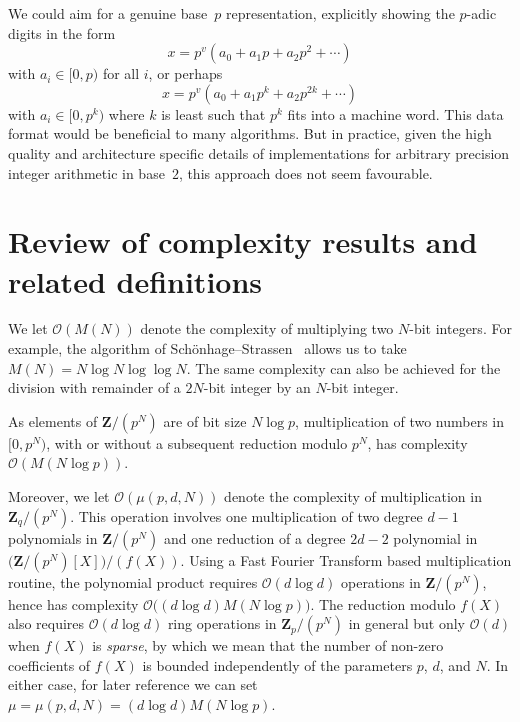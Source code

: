 \begin{rem}
We could aim for a genuine base~$p$ representation, explicitly showing 
the $p$-adic digits in the form 
\begin{equation}
x = p^v (a_0 + a_1 p + a_2 p^2 + \dotsb) 
\end{equation}
with $a_i \in [0,p)$ for all $i$, or perhaps 
\begin{equation}
x = p^v (a_0 + a_1 p^k + a_2 p^{2k} + \dotsb)
\end{equation}
with $a_i \in [0,p^k)$ where $k$ is least such that $p^{k}$ fits into 
a machine word.
This data format would be beneficial to many algorithms.  But in practice, 
given the high quality and architecture specific details of implementations 
for arbitrary precision integer arithmetic in base~$2$, this approach does 
not seem favourable.
\end{rem}

\section{Review of complexity results and related definitions}

We let $\mathcal{O}(M(N))$ denote the complexity of multiplying two 
$N$-bit integers.  For example, the algorithm of 
Sch\"onhage--Strassen~\citep{SchoenhageStrassen1971}
allows us to take $M(N) = N \log N \log \log N$.  The same 
complexity can also be achieved for the division with remainder of 
a $2N$-bit integer by an $N$-bit integer.

As elements of $\mathbf{Z} / (p^N)$ are of bit size $N \log p$, 
multiplication of two numbers in $[0, p^N)$, with or without a subsequent 
reduction modulo $p^N$, has complexity $\mathcal{O}(M(N \log p))$.

Moreover, we let $\mathcal{O}(\mu(p,d,N))$ denote the 
complexity of multiplication in $\mathbf{Z}_q / (p^N)$.  This operation 
involves one multiplication of two degree $d-1$ polynomials in 
$\mathbf{Z}/(p^N)$ and one reduction of a degree $2d - 2$ polynomial 
in $\bigl( \mathbf{Z}/(p^N)[X] \bigr) / (f(X))$.  Using a Fast Fourier 
Transform based multiplication routine, the polynomial product requires 
$\mathcal{O}(d \log d)$ operations in $\mathbf{Z}/(p^N)$, hence has 
complexity $\mathcal{O}\bigl((d \log d) M(N \log p)\bigr)$.  The reduction 
modulo $f(X)$ also requires $\mathcal{O}(d \log d)$ ring operations 
in $\mathbf{Z}_p / (p^N)$ in general but only $\mathcal{O}(d)$ when 
$f(X)$ is \emph{sparse}, by which we mean that the number of non-zero 
coefficients of $f(X)$ is bounded independently of the parameters 
$p$, $d$, and $N$.  In either case, for later reference we can set 
$\mu = \mu(p,d,N) = (d \log d) M(N \log p)$.


